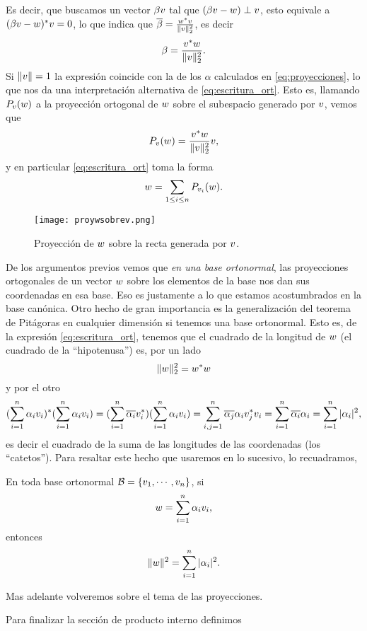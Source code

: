 Es decir, que buscamos un vector $\beta\vb$
 tal que $(\beta\vb -\wb)\perp \vb$, esto equivale a
 $(\beta\vb -\wb)^* \vb=0$, lo que indica que $\overline{\beta}=\frac{\wb^*\vb}{\|\vb\|_2^2}$, es decir
 $$
 \beta=\frac{\vb^*\wb}{\|\vb\|_2^2}.
 $$
 Si $\|\vb\|=1$ la expresión coincide con la de los $\alpha$ calculados en \eqref{eq:proyecciones}, lo que nos da una interpretación alternativa de \eqref{eq:escritura_ort}. Esto es, llamando
 $\Pb_{\vb}(\wb)$ a la proyección ortogonal de $\wb$ sobre el subespacio generado por $\vb$, vemos que
\begin{equation}
 \label{eq:proy_forma1}
 \Pb_{\vb}(\wb)=\frac{\vb^*\wb}{\|\vb\|_2^2}\vb,
\end{equation}
y en particular \eqref{eq:escritura_ort} toma la forma
 $$
 \wb=\sum_{1\le i\le n}\Pb_{\vb_i}(\wb).
 $$

\begin{figure}
\texttt{[image: proywsobrev.png]}
\caption{Proyección de $\wb$ sobre la recta generada por $\vb$.}
 \label{fig:proyusobrev}
\end{figure}

\tcc
De los argumentos previos vemos que \emph{en una base ortonormal}, las proyecciones ortogonales de un vector $\wb$ sobre los elementos de la base nos dan sus coordenadas en esa base. Eso  es justamente a lo que estamos acostumbrados en la base can\'onica.
\etcc
Otro hecho de gran importancia es la generalización del teorema de Pitágoras en cualquier dimensión si tenemos una base ortonormal. Esto es, de la expresión \eqref{eq:escritura_ort}, tenemos que el cuadrado de la longitud de $\wb$ (el cuadrado de la ``hipotenusa'') es, por un lado
$$\|\wb\|^2_2=\wb^*\wb$$ y por el otro
$$
(\sum_{i=1}^n\alpha_i\vb_i)^*(\sum_{i=1}^n\alpha_i\vb_i)=(\sum_{i=1}^n\overline{\alpha_i}\vb_i^*)(\sum_{i=1}^n\alpha_i\vb_i)=
\sum_{i,j=1}^n\overline{\alpha_j}\alpha_i\vb_j^*\vb_i=\sum_{i=1}^n\overline{\alpha_i}\alpha_i=\sum_{i=1}^n|\alpha_i|^2,
$$
es decir el cuadrado de la suma de las longitudes de las coordenadas (los ``catetos'').
Para resaltar este hecho que usaremos en lo sucesivo, lo recuadramos,
\tcc
\begin{observacion}
\label{obs:pitagoras}
En toda base ortonormal $\mathcal{B}=\{\vb_1,\cdots,\vb_n\}$, si
$$
\wb=\sum_{i=1}^n\alpha_i\vb_i,
$$
entonces
$$
\|\wb\|^2=\sum_{i=1}^n|\alpha_i|^2.
$$
\end{observacion}
\etcc
Mas adelante volveremos sobre el tema de las proyecciones.

Para finalizar la sección de producto interno definimos

